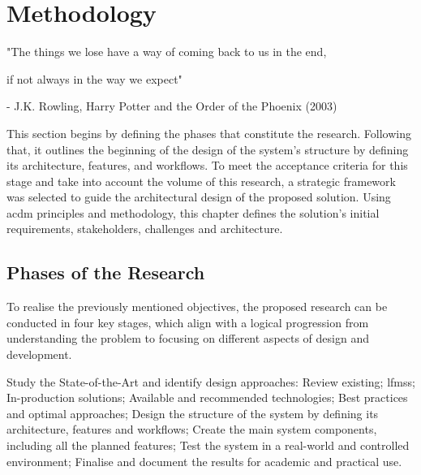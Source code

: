 \chapter{Methodology}
\label{chapter:methodology}

\begin{introduction}
"The things we lose have a way of coming back to us in the end,

if not always in the way we expect"

- J.K. Rowling, Harry Potter and the Order of the Phoenix (2003)
\end{introduction}

This section begins by defining the phases that constitute the research. Following that, it outlines the beginning of the design of the system's structure by defining its architecture, features, and workflows. To meet the acceptance criteria for this stage and take into account the volume of this research, a strategic framework was selected to guide the architectural design of the proposed solution. Using \ac{acdm} principles and methodology, this chapter defines the solution's initial requirements, stakeholders, challenges and architecture.


\section{Phases of the Research} \label{section:phases_of_the_research}

To realise the previously mentioned objectives, the proposed research can be conducted in four key stages, which align with a logical progression from understanding the problem to focusing on different aspects of design and development.

\begin{outline}[enumerate]
    \1 Study the State-of-the-Art and identify design approaches:
        \2 Review existing;
        \2 \aclp{lfms};
        \2 In-production solutions;
        \2 Available and recommended technologies;
        \2 Best practices and optimal approaches;
    \1 Design the structure of the system by defining its architecture, features and workflows;
    \1 Create the main system components, including all the planned features;
    \1 Test the system in a real-world and controlled environment;
    \1 Finalise and document the results for academic and practical use.
\end{outline}

